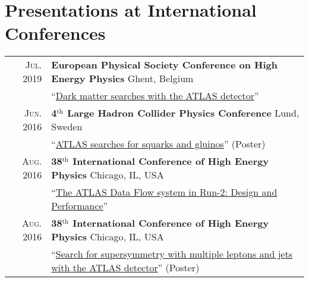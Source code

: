 \documentclass[a4paper,10pt]{article}
\begin{document}
\section{Presentations at International Conferences} %
\begin{tabular}{rp{15.5cm}}
\textsc{Jul. 2019}    & {\bf European Physical Society Conference on High Energy Physics} \hfill Ghent, Belgium \\
            & ``\href{https://cds.cern.ch/record/2683385}{Dark matter searches with the ATLAS detector}''   \\
\textsc{Jun. 2016}    & {\bf 4$^{\mathrm{th}}$ Large Hadron Collider Physics Conference} \hfill Lund, Sweden \\
            & ``\href{https://cds.cern.ch/record/2162918}{ATLAS searches for squarks and gluinos}''  (Poster) \\
\textsc{Aug. 2016}    & {\bf 38$^{\mathrm{th}}$ International Conference of High Energy Physics} \hfill Chicago, IL, USA \\
            & ``\href{https://cds.cern.ch/record/2209354}{The ATLAS Data Flow system in Run-2: Design and Performance}'' \\
\textsc{Aug. 2016}    & {\bf 38$^{\mathrm{th}}$ International Conference of High Energy Physics} \hfill Chicago, IL, USA \\
            & ``\href{http://cds.cern.ch/record/2208075}{Search for supersymmetry with multiple leptons and jets
            with the ATLAS detector}''  (Poster) \\
\end{tabular}
\end{document}
